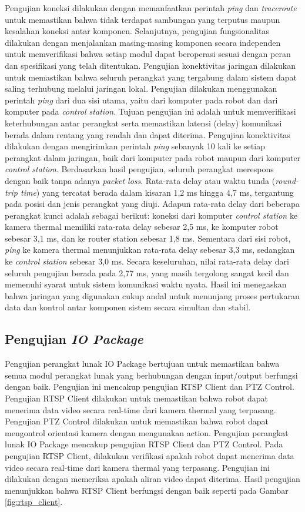 Pengujian koneksi dilakukan dengan memanfaatkan perintah \emph{ping} dan \emph{traceroute}
untuk memastikan bahwa tidak terdapat sambungan yang terputus maupun kesalahan
koneksi antar komponen. Selanjutnya, pengujian fungsionalitas dilakukan dengan
menjalankan masing-masing komponen secara independen untuk memverifikasi bahwa
setiap modul dapat beroperasi sesuai dengan peran dan spesifikasi yang telah
ditentukan. Pengujian konektivitas jaringan dilakukan untuk memastikan bahwa seluruh
perangkat yang tergabung dalam sistem dapat saling terhubung melalui jaringan lokal.
Pengujian dilakukan menggunakan perintah \textit{ping} dari dua sisi utama,
yaitu dari komputer pada robot dan dari komputer pada \textit{control station}.
Tujuan pengujian ini adalah untuk memverifikasi keterhubungan antar perangkat
serta memastikan latensi (delay) komunikasi berada dalam rentang yang rendah dan
dapat diterima. Pengujian konektivitas dilakukan dengan mengirimkan perintah \textit{ping}
sebanyak 10 kali ke setiap perangkat dalam jaringan, baik dari komputer pada robot
maupun dari komputer \textit{control station}. Berdasarkan hasil pengujian,
seluruh perangkat merespons dengan baik tanpa adanya \textit{packet loss}. Rata-rata
delay atau waktu tunda (\textit{round-trip time}) yang tercatat berada dalam kisaran
1{,}2 ms hingga 4{,}7 ms, tergantung pada posisi dan jenis perangkat yang diuji.
Adapun rata-rata delay dari beberapa perangkat kunci adalah sebagai berikut:
koneksi dari komputer \textit{control station} ke kamera thermal memiliki rata-rata
delay sebesar 2{,}5 ms, ke komputer robot sebesar 3{,}1 ms, dan ke router station
sebesar 1{,}8 ms. Sementara dari sisi robot, \textit{ping} ke kamera thermal
menunjukkan rata-rata delay sebesar 3{,}3 ms, sedangkan ke \textit{control
station} sebesar 3{,}0 ms. Secara keseluruhan, nilai rata-rata delay dari
seluruh pengujian berada pada 2{,}77 ms, yang masih tergolong sangat kecil dan memenuhi
syarat untuk sistem komunikasi waktu nyata. Hasil ini menegaskan bahwa jaringan
yang digunakan cukup andal untuk menunjang proses pertukaran data dan kontrol
antar komponen sistem secara simultan dan stabil.

\subsection{Pengujian \emph{IO Package}}
Pengujian perangkat lunak IO Package bertujuan untuk memastikan bahwa semua
modul perangkat lunak yang berhubungan dengan input/output berfungsi dengan baik.
Pengujian ini mencakup pengujian RTSP Client dan PTZ Control. Pengujian RTSP
Client dilakukan untuk memastikan bahwa robot dapat menerima data video secara
real-time dari kamera thermal yang terpasang. Pengujian PTZ Control dilakukan untuk
memastikan bahwa robot dapat mengontrol orientasi kamera dengan mengunakan action.
Pengujian perangkat lunak IO Package mencakup pengujian RTSP Client dan PTZ
Control. Pada pengujian RTSP Client, dilakukan verifikasi apakah robot dapat
menerima data video secara real-time dari kamera thermal yang terpasang. Pengujian
ini dilakukan dengan memeriksa apakah aliran video dapat diterima. Hasil
pengujian menunjukkan bahwa RTSP Client berfungsi dengan baik seperti pada
Gambar \ref{fig:rtsp_client}.


